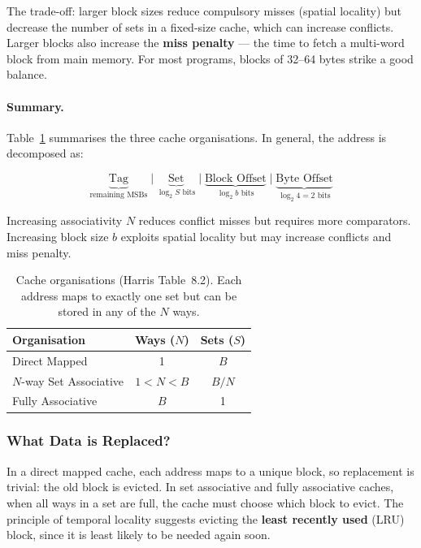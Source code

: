 \documentclass[9pt, a4paper]{extarticle}
\begin{document}
The trade-off: larger block sizes reduce compulsory misses (spatial locality) but decrease the number of sets in a fixed-size cache, which can increase conflicts. Larger blocks also increase the \textbf{miss penalty} --- the time to fetch a multi-word block from main memory. For most programs, blocks of 32--64 bytes strike a good balance.

\paragraph{Summary.} Table~\ref{tab:cache-org} summarises the three cache organisations. In general, the address is decomposed as:

$$
\underbrace{\text{Tag}}_{\text{remaining MSBs}} \;\Big|\; \underbrace{\text{Set}}_{\log_2 S \text{ bits}} \;\Big|\; \underbrace{\text{Block Offset}}_{\log_2 b \text{ bits}} \;\Big|\; \underbrace{\text{Byte Offset}}_{\log_2 4 = 2 \text{ bits}}
$$

Increasing associativity $N$ reduces conflict misses but requires more comparators. Increasing block size $b$ exploits spatial locality but may increase conflicts and miss penalty.

\begin{table}[htbp]
\centering\small
\begin{tabular}{@{}l c c@{}}
    \toprule
    Organisation & Ways ($N$) & Sets ($S$) \\
    \midrule
    Direct Mapped & 1 & $B$ \\
    $N$-way Set Associative & $1 < N < B$ & $B/N$ \\
    Fully Associative & $B$ & 1 \\
    \bottomrule
\end{tabular}
\caption{Cache organisations (Harris Table~8.2). Each address maps to exactly one set but can be stored in any of the $N$ ways.}
\label{tab:cache-org}
\end{table}

\subsubsection{What Data is Replaced?}

In a direct mapped cache, each address maps to a unique block, so replacement is trivial: the old block is evicted. In set associative and fully associative caches, when all ways in a set are full, the cache must choose which block to evict. The principle of temporal locality suggests evicting the \textbf{least recently used} (LRU) block, since it is least likely to be needed again soon.
\end{document}
